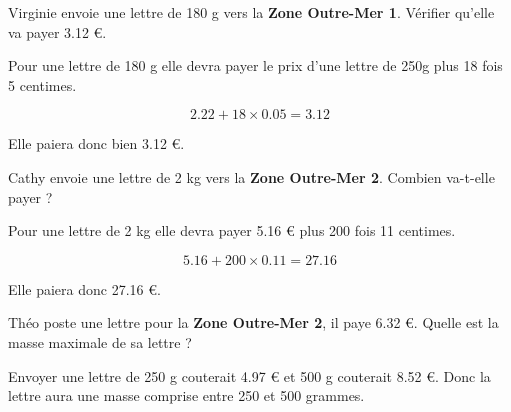 \begin{questions}
	\question[1] Virginie envoie une lettre de 180 g vers la \textbf{Zone Outre-Mer 1}. Vérifier qu'elle va payer \num{3.12} €.
	
	\begin{solution}
		Pour une lettre de 180 g elle devra payer le prix d'une lettre de 250g plus 18 fois 5 centimes.
		
		\begin{equation*}
			\num{2.22} + 18 \times \num{0.05} = \num{3.12}
		\end{equation*}
		
		Elle paiera donc bien \num{3.12} €.
	\end{solution}
	
	\question[1] Cathy envoie une lettre de 2 kg vers la \textbf{Zone Outre-Mer 2}. Combien va-t-elle payer ?
	\begin{solution}
		Pour une lettre de 2 kg elle devra payer \num{5.16} € plus 200 fois 11 centimes.
		
		\begin{equation*}
		\num{5.16} + 200 \times \num{0.11} = \num{27.16}
		\end{equation*}
		
		Elle paiera donc \num{27.16} €.
	\end{solution}
	
	\question[1] Théo poste une lettre pour la \textbf{Zone Outre-Mer 2}, il paye \num{6.32} €. Quelle est la masse maximale de sa lettre ?
	
	\begin{solution}
		Envoyer une lettre de 250 g couterait \num{4.97} € et 500 g couterait \num{8.52} €. Donc la lettre aura une masse comprise entre 250 et 500 grammes.
	\end{solution}
	

	

\end{questions}